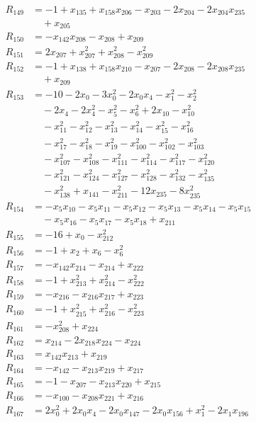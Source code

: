 \begin{align*}
R_{149}&=-1+x_{135}+x_{158}x_{206}-x_{203}-2x_{204}-2x_{204}x_{235}\\
&\quad{}+x_{205}\\
R_{150}&=-x_{142}x_{208}-x_{208}+x_{209}\\
R_{151}&=2x_{207}+x_{207}^{2}+x_{208}^{2}-x_{209}^{2}\\
R_{152}&=-1+x_{138}+x_{158}x_{210}-x_{207}-2x_{208}-2x_{208}x_{235}\\
&\quad{}+x_{209}\\
R_{153}&=-10-2x_{0}-3x_{0}^{2}-2x_{0}x_{4}-x_{1}^{2}-x_{2}^{2}\\
&\quad{}-2x_{4}-2x_{4}^{2}-x_{5}^{2}-x_{6}^{2}+2x_{10}-x_{10}^{2}\\
&\quad{}-x_{11}^{2}-x_{12}^{2}-x_{13}^{2}-x_{14}^{2}-x_{15}^{2}-x_{16}^{2}\\
&\quad{}-x_{17}^{2}-x_{18}^{2}-x_{19}^{2}-x_{100}^{2}-x_{102}^{2}-x_{103}^{2}\\
&\quad{}-x_{107}^{2}-x_{108}^{2}-x_{111}^{2}-x_{114}^{2}-x_{117}^{2}-x_{120}^{2}\\
&\quad{}-x_{121}^{2}-x_{124}^{2}-x_{127}^{2}-x_{128}^{2}-x_{132}^{2}-x_{135}^{2}\\
&\quad{}-x_{138}^{2}+x_{141}-x_{211}^{2}-12x_{235}-8x_{235}^{2}\\
R_{154}&=-x_{5}x_{10}-x_{5}x_{11}-x_{5}x_{12}-x_{5}x_{13}-x_{5}x_{14}-x_{5}x_{15}\\
&\quad{}-x_{5}x_{16}-x_{5}x_{17}-x_{5}x_{18}+x_{211}\\
R_{155}&=-16+x_{0}-x_{212}^{2}\\
R_{156}&=-1+x_{2}+x_{6}-x_{6}^{2}\\
R_{157}&=-x_{142}x_{214}-x_{214}+x_{222}\\
R_{158}&=-1+x_{213}^{2}+x_{214}^{2}-x_{222}^{2}\\
R_{159}&=-x_{216}-x_{216}x_{217}+x_{223}\\
R_{160}&=-1+x_{215}^{2}+x_{216}^{2}-x_{223}^{2}\\
R_{161}&=-x_{208}^{2}+x_{224}\\
R_{162}&=x_{214}-2x_{218}x_{224}-x_{224}\\
R_{163}&=x_{142}x_{213}+x_{219}\\
R_{164}&=-x_{142}-x_{213}x_{219}+x_{217}\\
R_{165}&=-1-x_{207}-x_{213}x_{220}+x_{215}\\
R_{166}&=-x_{100}-x_{208}x_{221}+x_{216}\\
R_{167}&=2x_{0}^{2}+2x_{0}x_{4}-2x_{0}x_{147}-2x_{0}x_{156}+x_{1}^{2}-2x_{1}x_{196}\\

\end{align*}
